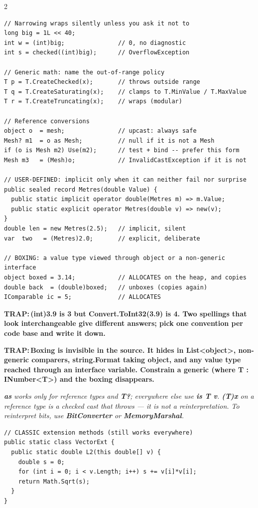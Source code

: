 \documentclass[9pt,a4paper]{extarticle}
\newenvironment{card}[3][acBlue]{%
  \begin{tcolorbox}[
    enhanced, colback=#2, colframe=bdCard,
    coltitle=black, colbacktitle=#2!70!bgHdr,
    fonttitle=\bfseries\fontsize{6.16pt}{7.48pt}\selectfont\MakeUppercase,
    title={#3},
    left=3pt, right=2pt, top=1.4pt, bottom=1.8pt,
    toptitle=1pt, bottomtitle=1pt,
    boxrule=0.4pt,
    borderline west={3pt}{0pt}{#1},
    arc=2pt, before skip=0pt, after skip=1.6mm,
    breakable, toprule at break=0pt, bottomrule at break=0pt,
  ]}{\end{tcolorbox}}
\newcommand{\code}[1]{{\ttfamily\bfseries #1}}
\newcommand{\trap}[1]{\par\noindent
  \begin{minipage}{\linewidth}%
  {\fontsize{5.6pt}{6.8pt}\selectfont\color{trap}\bfseries TRAP:\,#1}%
  \end{minipage}\par}
\newcommand{\note}[1]{\par\noindent
  \begin{minipage}{\linewidth}%
  {\fontsize{5.6pt}{6.8pt}\selectfont\itshape #1}%
  \end{minipage}\par}
\begin{document}
\begin{multicols}{2}
\begin{card}[acAmber]{bgAmber}{Conversions, Casting \& Boxing}
\begin{lstlisting}[style=cs]
// Narrowing wraps silently unless you ask it not to
long big = 1L << 40;
int w = (int)big;               // 0, no diagnostic
int s = checked((int)big);      // OverflowException

// Generic math: name the out-of-range policy
T p = T.CreateChecked(x);       // throws outside range
T q = T.CreateSaturating(x);    // clamps to T.MinValue / T.MaxValue
T r = T.CreateTruncating(x);    // wraps (modular)

// Reference conversions
object o  = mesh;               // upcast: always safe
Mesh? m1  = o as Mesh;          // null if it is not a Mesh
if (o is Mesh m2) Use(m2);      // test + bind -- prefer this form
Mesh m3   = (Mesh)o;            // InvalidCastException if it is not

// USER-DEFINED: implicit only when it can neither fail nor surprise
public sealed record Metres(double Value) {
  public static implicit operator double(Metres m) => m.Value;
  public static explicit operator Metres(double v) => new(v);
}
double len = new Metres(2.5);   // implicit, silent
var  two   = (Metres)2.0;       // explicit, deliberate

// BOXING: a value type viewed through object or a non-generic interface
object boxed = 3.14;            // ALLOCATES on the heap, and copies
double back  = (double)boxed;   // unboxes (copies again)
IComparable ic = 5;             // ALLOCATES
\end{lstlisting}
\trap{\code{(int)3.9} is \code{3} but \code{Convert.ToInt32(3.9)} is \code{4}.
Two spellings that look interchangeable give different answers; pick one
convention per code base and write it down.}
\trap{Boxing is invisible in the source. It hides in \code{List<object>},
non-generic comparers, \code{string.Format} taking \code{object}, and any
value type reached through an interface variable. Constrain a generic
(\code{where T : INumber<T>}) and the boxing disappears.}
\note{\code{as} works only for reference types and \code{T?}; everywhere else
use \code{is T v}. \code{(T)x} on a reference type is a checked cast that
throws --- it is not a reinterpretation. To reinterpret \emph{bits}, use
\code{BitConverter} or \code{MemoryMarshal}.}
\end{card}

\begin{card}[acOrange]{bgOrange}{Extension Members \& Lambdas}
\begin{lstlisting}[style=cs]
// CLASSIC extension methods (still works everywhere)
public static class VectorExt {
  public static double L2(this double[] v) {
    double s = 0;
    for (int i = 0; i < v.Length; i++) s += v[i]*v[i];
    return Math.Sqrt(s);
  }
}


\end{lstlisting}
\end{card}
\end{multicols}
\end{document}
